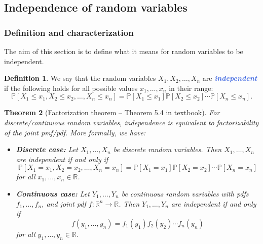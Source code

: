 \documentclass[10pt]{article}
\newtheorem{theorem}{Theorem}
\theoremstyle{definition}
\newtheorem{definition}[theorem]{Definition}
\newcommand{\1}[1]{\textbf{1}_{\left[#1\right]}} %
\def\R{\mathbb{R}} %
\def\P{\mathbb{P}} %
\newcommand{\demph}[1]{\textcolor{RoyalBlue}{\textbf{\slshape #1}}} %
\begin{document}
\subsection{Independence of random variables}

\subsubsection{Definition and characterization}
The aim of this section is to define what it means for random variables to be
independent.

\begin{definition}
  \label{def:independence-random-variables}
  We say that the random variables $X_{1},X_{2},\ldots,X_{n}$ are
  \demph{independent} if the following holds for all possible values
  $x_{1},\ldots,x_{n}$ in their range:
  \begin{equation*}
    \P\left[X_{1}\leq x_{1},X_{2}\leq x_{2},\ldots,X_{n}\leq x_{n}\right] = \P\left[X_{1}\leq x_{1}\right] \P\left[X_{2}\leq x_{2}\right] \cdots \P\left[X_{n}\leq x_{n}\right].
  \end{equation*}
\end{definition}

\begin{theorem}[Factorization theorem -- Theorem 5.4 in textbook]
  \label{thm:factorization-theorem}
  For discrete/continuous random variables, independence is equivalent to
  factorizability of the joint pmf/pdf. More formally, we have:
  
  \begin{itemize}
    \item \textbf{Discrete case:} Let $X_{1},\ldots,X_{n}$ be discrete random
    variables. Then $X_{1},\ldots,X_{n}$ are independent if and only if
    \begin{equation*}
      \P\left[X_{1}=x_{1},X_{2}=x_{2},\ldots, X_{n}=x_{n} \right] = \P\left[X_{1}= x_{1}\right]\P\left[X_{2}= x_{2}\right]\cdots \P\left[X_{n}= x_{n}\right]
    \end{equation*}
    for all $x_{1},\ldots,x_{n}\in \R$.
    \item \textbf{Continuous case:} Let $Y_{1},\ldots,Y_{n}$ be continuous
    random variables with pdfs $f_{1},\ldots,f_{n}$, and joint pdf
    $f:\R^{n} \to \R$. Then $Y_{1},\ldots,Y_{n}$ are independent if and only if
    \begin{equation*}
      f(y_{1},\ldots,y_{n}) = f_{1}(y_{1}) f_{2}(y_{2})\cdots f_{n}(y_{n})
    \end{equation*}
    for all $y_{1},\ldots,y_{n}\in \R$.
  \end{itemize}
\end{theorem}
\end{document}
